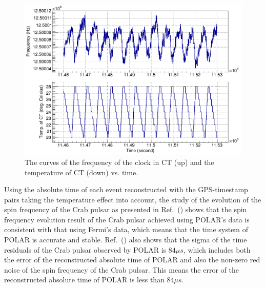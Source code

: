 \documentclass{raa}
\begin{document}
\begin{figure}[!ht]
\centering
\includegraphics[width=13cm]{images/freq_vs_temp.png}
\caption{The curves of the frequency of the clock in CT (up) and the temperature of CT (down) vs. time.}\label{fig:freq_vs_temp}
\end{figure}

Using the absolute time of each event reconstructed with the GPS-timestamp pairs taking the temperature effect into account, the study of the evolution of the spin frequency of the Crab pulsar as presented in Ref.~(\citealt{Zheng2017}) shows that the spin frequency evolution result of the Crab pulsar achieved using POLAR's data is consistent with that using Fermi's data, which means that the time system of POLAR is accurate and stable. Ref.~(\citealt{Zheng2017}) also shows that the sigma of the time residuals of the Crab pulsar observed by POLAR is $84\mu s$, which includes both the error of the reconstructed absolute time of POLAR and also the non-zero red noise of the spin frequency of the Crab pulsar. This means the error of the reconstructed absolute time of POLAR is less than $84\mu s$.
\end{document}
